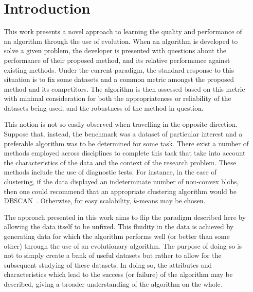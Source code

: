 \section{Introduction}\label{section:introduction}

This work presents a novel approach to learning the quality and performance of
an algorithm through the use of evolution. When an algorithm is developed to
solve a given problem, the developer is presented with questions about the
performance of their proposed method, and its relative performance against
existing methods. Under the current paradigm, the standard response to this
situation is to fix some datasets and a common metric amongst the proposed
method and its competitors. The algorithm is then assessed based on this metric
with minimal consideration for both the appropriateness or reliability of the
datasets being used, and the robustness of the method in question.

This notion is not so easily observed when travelling in the opposite direction.
Suppose that, instead, the benchmark was a dataset of particular interest and a
preferable algorithm was to be determined for some task. There exist a number of
methods employed across disciplines to complete this task that take into account
the characteristics of the data and the context of the research problem. These
methods include the use of diagnostic tests. For instance, in the case of
clustering, if the data displayed an indeterminate number of non-convex blobs,
then one could recommend that an appropriate clustering algorithm would be
DBSCAN~\cite{Ester1996}. Otherwise, for easy scalability, \(k\)-means may be
chosen.

The approach presented in this work aims to flip the paradigm described here by
allowing the data itself to be unfixed. This fluidity in the data is achieved by
generating data for which the algorithm performs well (or better than some
other) through the use of an evolutionary algorithm. The purpose of doing so is
not to simply create a bank of useful datasets but rather to allow for the
subsequent studying of these datasets. In doing so, the attributes and
characteristics which lead to the success (or failure) of the algorithm may be
described, giving a broader understanding of the algorithm on the whole.


